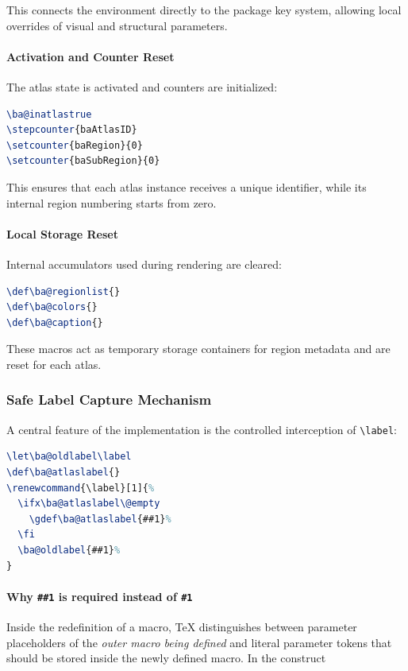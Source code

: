 This connects the environment directly to the package key system, allowing local overrides of visual and structural parameters.

\paragraph{Activation and Counter Reset}

The atlas state is activated and counters are initialized:

\begin{lstlisting}[language=LaTeX]
\ba@inatlastrue
\stepcounter{baAtlasID}
\setcounter{baRegion}{0}
\setcounter{baSubRegion}{0}
\end{lstlisting}

This ensures that each atlas instance receives a unique identifier, while its internal region numbering starts from zero.

\paragraph{Local Storage Reset}

Internal accumulators used during rendering are cleared:

\begin{lstlisting}[language=LaTeX]
\def\ba@regionlist{}
\def\ba@colors{}
\def\ba@caption{}
\end{lstlisting}

These macros act as temporary storage containers for region metadata and are reset for each atlas.

\subsubsection{Safe Label Capture Mechanism}

A central feature of the implementation is the controlled interception of \lstinline|\label|:

\begin{lstlisting}[language=LaTeX]
\let\ba@oldlabel\label
\def\ba@atlaslabel{}
\renewcommand{\label}[1]{%
  \ifx\ba@atlaslabel\@empty
    \gdef\ba@atlaslabel{##1}%
  \fi
  \ba@oldlabel{##1}%
}
\end{lstlisting}
\paragraph{Why \texttt{\#\#1} is required instead of \texttt{\#1}}

Inside the redefinition of a macro, TeX distinguishes between parameter placeholders of the \emph{outer macro being defined} and literal parameter tokens that should be stored inside the newly defined macro. In the construct

